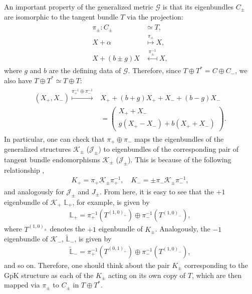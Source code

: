 \documentclass{article}
\newcommand{\TT}{{T\oplus T^*}}
\newcommand{\JJ}{\mathcal{J}}
\newcommand{\KK}{\mathcal{K}}
\newcommand{\GG}{\mathcal{G}}
\newcommand{\ap}{\alpha}
\newcommand{\Lb}{\mathbb{L}}
\theoremstyle{definition}
\theoremstyle{remark}
\begin{document}
An important property of the generalized metric $\GG$ is that its  eigenbundles $C_\pm$ are isomorphic to the tangent bundle $T$ via the projection:
\begin{align}\label{pi_iso}
\begin{aligned}
\pi_\pm:C_\pm &\simeq T,\\
X+\ap &\overset{\pi_\pm}{\longmapsto} X,\\
X+(b\pm g)X &\overset{\pi^{-1}_\pm}{\longmapsfrom} X,
\end{aligned}
\end{align}
where $g$ and $b$ are the defining data of $\GG$. Therefore, since $\TT=C\oplus C_-$, we also have $\TT\simeq T\oplus T$:
\begin{align}
\begin{aligned}
(X_+,X_-)\overset{\pi^{-1}_+\oplus \pi^{-1}_-}{\longmapsto}& X_++(b+g)X_++X_-+(b-g)X_-\\
&=
\begin{pmatrix}
 X_++X_- \\
 g(X_+-X_-)+b(X_++X_-)
\end{pmatrix}.
\end{aligned}\label{map_pi_pm}
\end{align}
In particular, one can check that $\pi_+\oplus \pi_-$ maps the eigenbundles of the generalized structures $\KK_\pm$ ($\JJ_\pm$) to eigenbundles of the corresponding pair of tangent bundle endomorphisms $\KK_\pm$ ($\JJ_\pm$). This is because of the following relationship \cite{Hu:2019zro},
\begin{align*}
K_+=\pi_+\KK_\pm\pi_+^{-1},\quad K_-=\pm\pi_-\KK_\pm\pi_-^{-1},
\end{align*}
and analogously for $\JJ_\pm$ and $J_\pm$. From here, it is easy to see that the $+1$ eigenbundle of $\KK_+$ $\Lb_+$, for example, is given by
\begin{align*}
\Lb_+=\pi_+^{-1}(T^{(1,0)_+})\oplus\pi_-^{-1}(T^{(1,0)_-}),
\end{align*}
where $T^{(1,0)_\pm}$ denotes the $+1$ eigenbundle of $K_\pm$. Analogously, the $-1$ eigenbundle of $\KK_-$,
$\widetilde{\Lb}_-$, is given by
\begin{align*}
\widetilde{\Lb}_-=\pi_+^{-1}(T^{(0,1)_+})\oplus\pi_-^{-1}(T^{(1,0)_-}),
\end{align*}
and so on. Therefore, one should think about the pair $K_\pm$ corresponding to the GpK structure as each of the $K_\pm$ acting on its own copy of $T$, which are then mapped via $\pi_\pm$ to $C_\pm$ in $\TT$.
\end{document}
